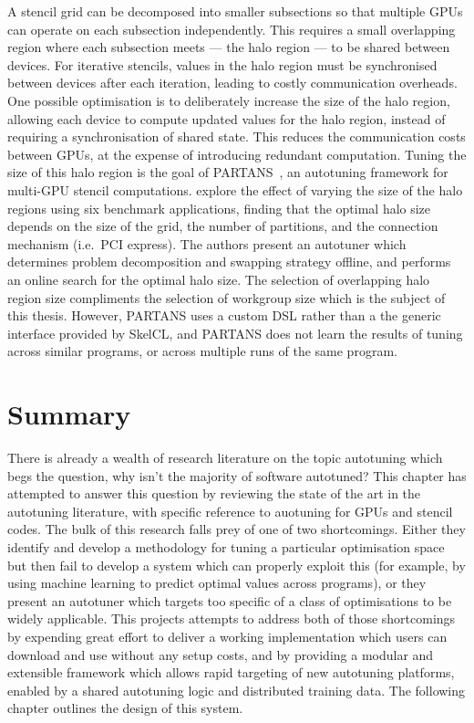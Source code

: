 A stencil grid can be decomposed into smaller subsections so that
multiple GPUs can operate on each subsection independently. This
requires a small overlapping region where each subsection meets ---
the halo region --- to be shared between devices. For iterative
stencils, values in the halo region must be synchronised between
devices after each iteration, leading to costly communication
overheads. One possible optimisation is to deliberately increase the
size of the halo region, allowing each device to compute updated
values for the halo region, instead of requiring a synchronisation of
shared state. This reduces the communication costs between GPUs, at
the expense of introducing redundant computation. Tuning the size of
this halo region is the goal of PARTANS~\cite{Lutz2013}, an autotuning
framework for multi-GPU stencil computations. \citeauthor{Lutz2013}
explore the effect of varying the size of the halo regions using six
benchmark applications, finding that the optimal halo size depends on
the size of the grid, the number of partitions, and the connection
mechanism (i.e.\ PCI express). The authors present an autotuner which
determines problem decomposition and swapping strategy offline, and
performs an online search for the optimal halo size. The selection of
overlapping halo region size compliments the selection of workgroup
size which is the subject of this thesis. However, PARTANS uses a
custom DSL rather than a the generic interface provided by SkelCL, and
PARTANS does not learn the results of tuning across similar programs,
or across multiple runs of the same program.


\section{Summary}

There is already a wealth of research literature on the topic
autotuning which begs the question, why isn't the majority of software
autotuned? This chapter has attempted to answer this question by
reviewing the state of the art in the autotuning literature, with
specific reference to auotuning for GPUs and stencil codes. The bulk
of this research falls prey of one of two shortcomings. Either they
identify and develop a methodology for tuning a particular
optimisation space but then fail to develop a system which can
properly exploit this (for example, by using machine learning to
predict optimal values across programs), or they present an autotuner
which targets too specific of a class of optimisations to be widely
applicable. This projects attempts to address both of those
shortcomings by expending great effort to deliver a working
implementation which users can download and use without any setup
costs, and by providing a modular and extensible framework which
allows rapid targeting of new autotuning platforms, enabled by a
shared autotuning logic and distributed training data. The following
chapter outlines the design of this system.
